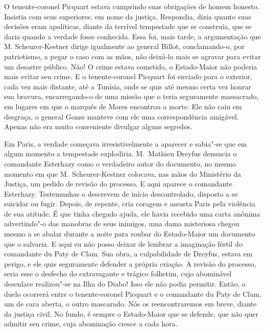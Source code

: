  O tenente-coronel Picquart estava cumprindo suas obrigações de homem
honesto. Insistia com seus superiores, em nome da justiça. Respondia,
dizia quanto suas decisões eram apolíticas, diante da terrível
tempestade que se construía, que se daria quando a verdade fosse
conhecida. Essa foi, mais tarde, a argumentação que M.
Scheurer-Kestner dirige igualmente ao general Billot, conclamando-o,
por patriotismo, a pegar o caso com as mãos, não deixá-lo mais se
agravar para evitar um desastre público. Não! O crime estava cometido,
o Estado-Maior não poderia mais evitar seu crime. E o
tenente-coronel Picquart foi enviado para o exterior, cada vez mais
distante, até a Tunísia, onde se quis até mesmo certa vez honrar sua
bravura, encarregando-o de uma missão que o teria seguramente
massacrado, em lugares em que o marquês de Mores encontrou a morte. Ele
não caiu em desgraça, o general Gonse manteve com ele uma
correspondência amigável. Apenas não era muito conveniente divulgar
alguns segredos.

 Em Paris, a verdade começava irresistivelmente a aparecer e sabia"-se
que em algum momento a tempestade explodiria. M.~Mathieu Dreyfus
denuncia o comandante Esterhazy como o verdadeiro autor do documento,
no mesmo momento em que M.~Scheurer-Kestner colocava, nas mãos do
Ministério da Justiça, um pedido de revisão do processo. E aqui aparece
o comandante Esterhazy. Testemunhas o descrevem de início
descontrolado, disposto a se suicidar ou fugir. Depois, de repente, 
cria coragem e assusta Paris pela violência de sua atitude.  É que
tinha chegado ajuda, ele havia recebido uma carta anônima advertindo"-o
das manobras de seus inimigos, uma dama misteriosa chegou mesmo a se
abalar durante a noite para roubar do Estado-Maior um documento
que o salvaria. E aqui eu não posso deixar de lembrar a
imaginação fértil do comandante du Paty de Clam. Sua obra, a
culpabilidade de Dreyfus, estava em perigo, e ele quis seguramente
defender a própria criação. A revisão do processo, seria esse o
desfecho do extravagante e trágico folhetim, cujo abominável
desenlace realizou"-se na Ilha do Diabo! Isso ele não podia permitir.
Então, o duelo ocorrerá entre o tenente-coronel Picquart e o
comandante du Paty de Clam, um de cara aberta, o outro mascarado. 
Nós os reencontraremos em breve, diante da justiça civil. No fundo, é sempre o
Estado-Maior que se defende, que não quer admitir seu crime, cuja abominação cresce a cada hora.

